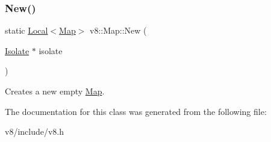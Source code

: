 \subsubsection{\texorpdfstring{New()}{New()}}
{\footnotesize\ttfamily static \mbox{\hyperlink{classv8_1_1Local}{Local}}$<$\mbox{\hyperlink{classv8_1_1Map}{Map}}$>$ v8\+::\+Map\+::\+New (\begin{DoxyParamCaption}\item[{\mbox{\hyperlink{classv8_1_1Isolate}{Isolate}} $\ast$}]{isolate }\end{DoxyParamCaption})\hspace{0.3cm}{\ttfamily [static]}}

Creates a new empty \mbox{\hyperlink{classv8_1_1Map}{Map}}. 

The documentation for this class was generated from the following file\+:\begin{DoxyCompactItemize}
\item 
v8/include/v8.\+h\end{DoxyCompactItemize}
